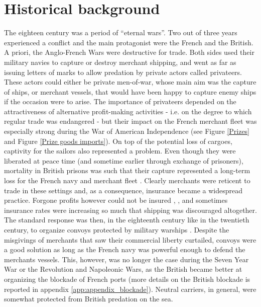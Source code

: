 \documentclass[12pt,a4paper,notitlepage,english]{article}
\begin{document}
\section{Historical background}
\label{sec:historical_background}
The eighteen century was a period of ``eternal wars''. Two out of three years experienced a conflict and the main protagonist were the French and the British. A priori, the Anglo-French Wars were destructive for trade. Both sides used their military navies to capture or destroy merchant shipping, and went as far as issuing letters of marks to allow predation by private actors called privateers.
These actors could either be private men-of-war, whose main aim was the capture of ships, or merchant vessels, that would have been happy to capture enemy ships if the occasion were to arise.
The importance of privateers depended on the attractiveness of alternative profit-making activities \cite[p. 673]{Villiers2002,Hillmann2011} - i.e. on the degree to which regular trade was endangered  - but their impact on the French merchant fleet was especially strong during the War of American Independence \cite[table 1]{Hillmann2011} (see Figure \ref{Prizes} and Figure \ref{Prize goods imports}).
On top of the potential loss of cargoes, captivity for the sailors also represented a problem. Even though they were liberated at peace time (and sometime earlier through exchange of prisoners), mortality in British prisons was such that their capture represented a long-term loss for the French navy and merchant fleet \cite{LeGoff1998}.
Clearly merchants were reticent to trade in these settings and, as a consequence, insurance became a widespread practice. Forgone profits however could not be insured \cite[p. 160]{Ducoin1993}, \cite{Villiers2002}, \cite[p. 690-720]{Butel1973} and sometimes insurance rates were increasing so much that shipping was discouraged altogether. 
The standard response was then, in the eighteenth century like in the twentieth century, to organize convoys protected by military warships \cite[p. 393, 407, 448, 641]{Villiers2002}. Despite the misgivings of merchants that saw their commercial liberty curtailed, convoys were a good solution as long as the French navy was powerful enough to defend the merchants vessels. This, however, was no longer the case during the Seven Year War or the Revolution and Napoleonic Wars, as 
the British became better at organizing the blockade of French ports (more details on the British blockade is reported in appendix \ref{app:appendix_blockade}).
Neutral carriers, in general, were somewhat protected from British predation on the sea.
\end{document}

